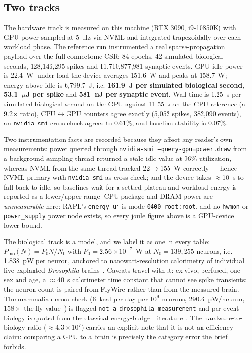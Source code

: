 \documentclass[11pt,a4paper]{article}
\newcommand{\code}[1]{\texttt{\footnotesize #1}}
\begin{document}
\subsection{Two tracks}
The hardware track is measured on this machine (RTX 3090, i9-10850K) with GPU power sampled at
5~Hz via NVML and integrated trapezoidally over each workload phase. The reference run
instrumented a real sparse-propagation payload over the full connectome CSR: 84 epochs,
42 simulated biological seconds, 128{,}146{,}295 spikes and 11{,}710{,}877{,}981 synaptic events.
GPU idle power is 22.4~W; under load the device averages 151.6~W and peaks at 158.7~W;
energy above idle is 6{,}799.7~J, i.e. \textbf{161.9~J per simulated biological second},
\textbf{53.1~$\mu$J per spike} and \textbf{581~nJ per synaptic event}. Wall time is 1.25~s per
simulated biological second on the GPU against 11.55~s on the CPU reference (a 9.2$\times$ ratio),
CPU$\leftrightarrow$GPU counters agree exactly (5{,}052 spikes, 382{,}090 events), an
\code{nvidia-smi} cross-check agrees to 0.61\%, and baseline stability is 0.07\%.

Two instrumentation facts are recorded because they affect any reader's own measurements: power
queried through \code{nvidia-smi --query-gpu=power.draw} from a background sampling thread
returned a stale idle value at 96\% utilization, whereas NVML from the same thread tracked
22$\to$155~W correctly --- hence NVML primary with \code{nvidia-smi} as cross-check; and the
device takes $\approx$10~s to fall back to idle, so baselines wait for a settled plateau and
workload energy is reported as a lower/upper range. CPU package and DRAM power are
\emph{unmeasurable} here: RAPL's \code{energy\_uj} is mode \code{0400 root:root}, and no
\code{hwmon} or \code{power\_supply} power node exists, so every joule figure above is a
GPU-device lower bound.

The biological track is a model, and we label it as one in every table: $P_{\text{bio}}(N) = P_0
N/N_0$ with $P_0 = 2.56\times10^{-7}$~W at $N_0 = 139{,}255$ neurons, i.e. 1.838~pW per neuron,
anchored to nanowatt-resolution calorimetry of individual live explanted \textit{Drosophila}
brains~\cite{panda-calorimetry,panda-preprint}. Caveats travel with it: ex vivo, perfused, one
sex and age, a $\approx$40~s calorimeter time constant that cannot see spike transients; the
neuron count is paired from FlyWire rather than from the measured brain. The mammalian
cross-check (6~kcal per day per $10^9$ neurons, 290.6~pW/neuron, $158\times$ the fly
value~\cite{herculano-houzel}) is flagged \code{not\_a\_drosophila\_measurement} and per-event
biology is quoted from the classical energy-budget literature~\cite{attwell-laughlin}. The
hardware-to-biology ratio ($\approx4.3\times10^7$) carries an explicit note that it is not an
efficiency claim: comparing a GPU to a brain is precisely the category error the brief forbids.
\end{document}
